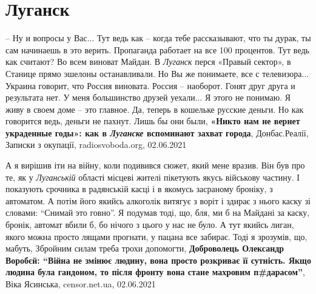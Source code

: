  
 
 
 
 
\chapter{Луганск}
\label{sec:slova.lugansk}

– Ну и вопросы у Вас... Тут ведь как – когда тебе рассказывают, что ты дурак,
ты сам начинаешь в это верить. Пропаганда работает на все 100 процентов. Тут
ведь как считают? Во всем виноват Майдан. В \emph{Луганск} перся «Правый сектор», в
Станице прямо эшелоны останавливали. Но Вы же понимаете, все с телевизора...
Украина говорит, что Россия виновата. Россия – наоборот. Гонят друг друга и
результата нет. У меня большинство друзей уехали... Я этого не понимаю. Я живу в
своем доме – это главное. Да, теперь в кошельке русские деньги. Но как
говорится ведь, деньги не пахнут. Лишь бы они были,
\textbf{«Никто нам не вернет украденные годы»: как в \emph{Луганске} вспоминают захват города},
Донбас.Реалії, Записки з окупації, radiosvoboda.org, 02.06.2021

А я вирішив іти на війну, коли подивився сюжет, який мене вразив. Він був про
те, як у \emph{Луганській} області місцеві жителі пікетують якусь військову частину. І
показують срочника в радянській касці і в якомусь засраному броніку, з
автоматом. А потім його якийсь алкоголік витягує з воріт і здирає з нього каску
зі словами: \enquote{Снимай это говно}. Я подумав тоді, що, бля, ми б на Майдані за
каску, бронік, автомат вбили б, бо нічого з цього у нас не було. А тут якийсь
лиган, якого можна просто лящами прогнати, у пацана все забирає. Тоді я
зрозумів, що, мабуть, Збройним силам треба трохи допомогти, 
\textbf{Доброволець Олександр Воробєй: \enquote{Війна не змінює людину, вона
просто розкриває її сутність. Якщо людина була гандоном, то після фронту вона
стане махровим п\#дарасом}},
Віка Ясинська, censor.net.ua, 02.06.2021



